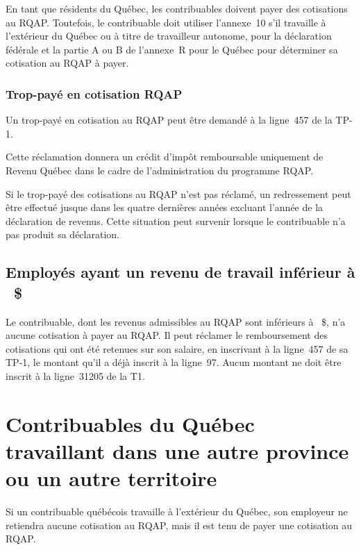 En tant que résidents du Québec, les contribuables doivent payer des cotisations au RQAP. Toutefois, le contribuable doit utiliser l'annexe~10 s'il travaille à l'extérieur du Québec ou à titre de travailleur autonome, pour la déclaration fédérale et la partie A ou B de l'annexe~R pour le Québec pour déterminer sa cotisation au RQAP à payer.

\subsubsection{Trop-payé en cotisation RQAP}
Un trop-payé en cotisation au RQAP peut être demandé à la ligne~457 de la TP-1. 

Cette réclamation donnera un crédit d'impôt remboursable uniquement de Revenu Québec dans le cadre de l'administration du programme RQAP.

\begin{note}
	Si le trop-payé des cotisations au RQAP n'est pas réclamé, un redressement peut être effectué jusque dans les quatre dernières années excluant l'année de la déclaration de revenus. Cette situation peut survenir lorsque le contribuable n'a pas produit sa déclaration.
\end{note}


\subsection{Employés ayant un revenu de travail inférieur à ~\$}

Le contribuable, dont les revenus admissibles au RQAP sont inférieurs à ~\$, n'a aucune cotisation à payer au RQAP. Il peut réclamer le remboursement des cotisations qui ont été retenues sur son salaire, en inscrivant à la ligne~457 de sa TP-1, le montant qu'il a déjà inscrit à la ligne~97. Aucun montant ne doit être inscrit à la ligne~31205 de la T1.



\section{Contribuables du Québec travaillant dans une autre province ou un autre territoire}
\begin{note}
	Si un contribuable québécois travaille à l'extérieur du Québec, son employeur ne retiendra aucune cotisation au RQAP, mais il est tenu de payer une cotisation au RQAP.
\end{note}

